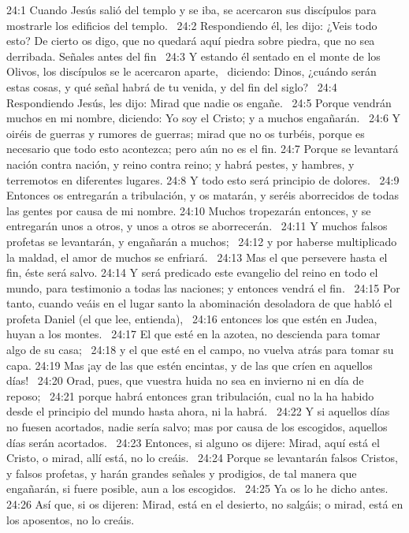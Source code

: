 24:1 Cuando Jesús salió del templo y se iba, se acercaron sus discípulos para mostrarle los edificios del templo.  
24:2 Respondiendo él, les dijo: ¿Veis todo esto? De cierto os digo, que no quedará aquí piedra sobre piedra, que no sea derribada. 
Señales antes del fin   
24:3 Y estando él sentado en el monte de los Olivos, los discípulos se le acercaron aparte,  
diciendo: Dinos, ¿cuándo serán estas cosas, y qué señal habrá de tu venida, y del fin del siglo?  
24:4 Respondiendo Jesús, les dijo: Mirad que nadie os engañe.  
24:5 Porque vendrán muchos en mi nombre, diciendo: Yo soy el Cristo; y a muchos engañarán.  
24:6 Y oiréis de guerras y rumores de guerras; mirad que no os turbéis, porque es necesario que todo esto acontezca; pero aún no es el fin. 
24:7 Porque se levantará nación contra nación, y reino contra reino; y habrá pestes, y hambres, y terremotos en diferentes lugares. 
24:8 Y todo esto será principio de dolores.  
24:9 Entonces os entregarán a tribulación, y os matarán, y seréis aborrecidos de todas las gentes por causa de mi nombre. 
24:10 Muchos tropezarán entonces, y se entregarán unos a otros, y unos a otros se aborrecerán.  
24:11 Y muchos falsos profetas se levantarán, y engañarán a muchos;  
24:12 y por haberse multiplicado la maldad, el amor de muchos se enfriará.  
24:13 Mas el que persevere hasta el fin, éste será salvo. 
24:14 Y será predicado este evangelio del reino en todo el mundo, para testimonio a todas las naciones; y entonces vendrá el fin.  
24:15 Por tanto, cuando veáis en el lugar santo la abominación desoladora de que habló el profeta Daniel (el que lee, entienda),  
24:16 entonces los que estén en Judea, huyan a los montes.  
24:17 El que esté en la azotea, no descienda para tomar algo de su casa;  
24:18 y el que esté en el campo, no vuelva atrás para tomar su capa. 
24:19 Mas ¡ay de las que estén encintas, y de las que críen en aquellos días!  
24:20 Orad, pues, que vuestra huida no sea en invierno ni en día de reposo;  
24:21 porque habrá entonces gran tribulación, cual no la ha habido desde el principio del mundo hasta ahora, ni la habrá.  
24:22 Y si aquellos días no fuesen acortados, nadie sería salvo; mas por causa de los escogidos, aquellos días serán acortados.  
24:23 Entonces, si alguno os dijere: Mirad, aquí está el Cristo, o mirad, allí está, no lo creáis.  
24:24 Porque se levantarán falsos Cristos, y falsos profetas, y harán grandes señales y prodigios, de tal manera que engañarán, si fuere posible, aun a los escogidos.  
24:25 Ya os lo he dicho antes.  
24:26 Así que, si os dijeren: Mirad, está en el desierto, no salgáis; o mirad, está en los aposentos, no lo creáis.  
